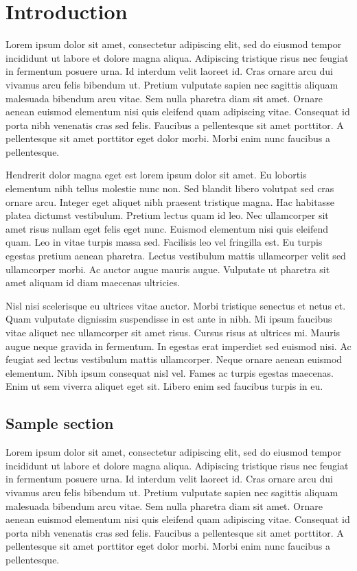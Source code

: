 \chapter{Introduction}

Lorem ipsum dolor sit amet, consectetur adipiscing elit, sed do eiusmod tempor incididunt ut labore et dolore magna aliqua. Adipiscing tristique risus nec feugiat in fermentum posuere urna. Id interdum velit laoreet id. Cras ornare arcu dui vivamus arcu felis bibendum ut. Pretium vulputate sapien nec sagittis aliquam malesuada bibendum arcu vitae. Sem nulla pharetra diam sit amet. Ornare aenean euismod elementum nisi quis eleifend quam adipiscing vitae. Consequat id porta nibh venenatis cras sed felis. Faucibus a pellentesque sit amet porttitor. A pellentesque sit amet porttitor eget dolor morbi. Morbi enim nunc faucibus a pellentesque.

Hendrerit dolor magna eget est lorem ipsum dolor sit amet. Eu lobortis elementum nibh tellus molestie nunc non. Sed blandit libero volutpat sed cras ornare arcu. Integer eget aliquet nibh praesent tristique magna. Hac habitasse platea dictumst vestibulum. Pretium lectus quam id leo. Nec ullamcorper sit amet risus nullam eget felis eget nunc. Euismod elementum nisi quis eleifend quam. Leo in vitae turpis massa sed. Facilisis leo vel fringilla est. Eu turpis egestas pretium aenean pharetra. Lectus vestibulum mattis ullamcorper velit sed ullamcorper morbi. Ac auctor augue mauris augue. Vulputate ut pharetra sit amet aliquam id diam maecenas ultricies.

Nisl nisi scelerisque eu ultrices vitae auctor. Morbi tristique senectus et netus et. Quam vulputate dignissim suspendisse in est ante in nibh. Mi ipsum faucibus vitae aliquet nec ullamcorper sit amet risus. Cursus risus at ultrices mi. Mauris augue neque gravida in fermentum. In egestas erat imperdiet sed euismod nisi. Ac feugiat sed lectus vestibulum mattis ullamcorper. Neque ornare aenean euismod elementum. Nibh ipsum consequat nisl vel. Fames ac turpis egestas maecenas. Enim ut sem viverra aliquet eget sit. Libero enim sed faucibus turpis in eu.

\section{Sample section} \label{sample_section}

Lorem ipsum dolor sit amet, consectetur adipiscing elit, sed do eiusmod tempor incididunt ut labore et dolore magna aliqua. Adipiscing tristique risus nec feugiat in fermentum posuere urna. Id interdum velit laoreet id. Cras ornare arcu dui vivamus arcu felis bibendum ut. Pretium vulputate sapien nec sagittis aliquam malesuada bibendum arcu vitae. Sem nulla pharetra diam sit amet. Ornare aenean euismod elementum nisi quis eleifend quam adipiscing vitae. Consequat id porta nibh venenatis cras sed felis. Faucibus a pellentesque sit amet porttitor. A pellentesque sit amet porttitor eget dolor morbi. Morbi enim nunc faucibus a pellentesque.

